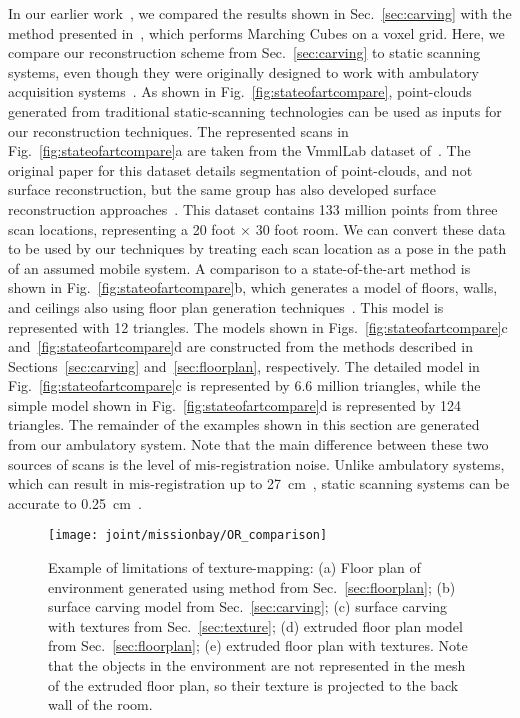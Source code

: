 \documentclass[10pt,twocolumn,twoside]{IEEEtran}
\begin{document}
In our earlier work~\cite{Turner13}, we compared the results shown in Sec.~\ref{sec:carving} with the method presented in~\cite{Carving}, which performs Marching Cubes on a voxel grid.  Here, we compare our reconstruction scheme from Sec.~\ref{sec:carving} to static scanning systems, even though they were originally designed to work with ambulatory acquisition systems~\cite{Backpack}.  As shown in Fig.~\ref{fig:stateofartcompare}, point-clouds generated from traditional static-scanning technologies can be used as inputs for our reconstruction techniques. The represented scans in Fig.~\ref{fig:stateofartcompare}a are taken from the VmmlLab dataset of~\cite{Mattausch14}.  The original paper for this dataset details segmentation of point-clouds, and not surface reconstruction, but the same group has also developed surface reconstruction approaches~\cite{Mura13,Mura14}. This dataset contains 133 million points from three scan locations, representing a 20 foot $\times$ 30 foot room.  We can convert these data to be used by our techniques by treating each scan location as a pose in the path of an assumed mobile system.  A comparison to a state-of-the-art method is shown in Fig.~\ref{fig:stateofartcompare}b, which generates a model of floors, walls, and ceilings also using floor plan generation techniques~\cite{Mura13}.  This model is represented with 12 triangles.  The models shown in Figs.~\ref{fig:stateofartcompare}c and~\ref{fig:stateofartcompare}d are constructed from the methods described in Sections~\ref{sec:carving} and~\ref{sec:floorplan}, respectively.  The detailed model in Fig.~\ref{fig:stateofartcompare}c is represented by 6.6 million triangles, while the simple model shown in Fig.~\ref{fig:stateofartcompare}d is represented by 124 triangles.  The remainder of the examples shown in this section are generated from our ambulatory system.  Note that the main difference between these two sources of scans is the level of mis-registration noise. Unlike ambulatory systems, which can result in mis-registration up to 27~cm~\cite{NickJournal}, static scanning systems can be accurate to 0.25~cm~\cite{Mura13}.

\begin{figure*}[t]
	\centerline{\texttt{[image: joint/missionbay/OR\_comparison]}}
	\caption{Example of limitations of texture-mapping:  (a) Floor plan of environment generated using method from Sec.~\ref{sec:floorplan}; (b) surface carving model from Sec.~\ref{sec:carving}; (c) surface carving with textures from Sec.~\ref{sec:texture}; (d) extruded floor plan model from Sec.~\ref{sec:floorplan}; (e) extruded floor plan with textures.  Note that the objects in the environment are not represented in the mesh of the extruded floor plan, so their texture is projected to the back wall of the room.}
	\label{fig:missionbay}
\end{figure*}
\end{document}
